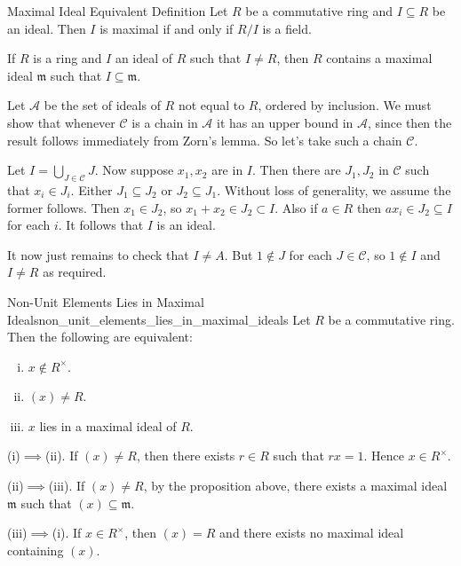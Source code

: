 \begin{proposition}{Maximal Ideal Equivalent Definition}{}
    Let $R$ be a commutative ring and $I\subseteq R$ be an ideal. Then $I$ is maximal if and only if $R/I$ is a field.  
\end{proposition}

\begin{proposition}{}{}
    If $R$ is a ring and $I$ an ideal of $R$ such that $I \neq R$, then $R$ contains a maximal ideal $\mathfrak{m}$ such that $I \subseteq \mathfrak{m}$.
\end{proposition}

\begin{prf}
    Let $\mathcal{A}$ be the set of ideals of $R$ not equal to $R$, ordered by inclusion. We must show that whenever $\mathcal{C}$ is a chain in $\mathcal{A}$ it has an upper bound in $\mathcal{A}$, since then the result follows immediately from Zorn's lemma. So let's take such a chain $\mathcal{C}$.

Let $I=\bigcup_{J \in \mathcal{C}} J$. Now suppose $x_1, x_2$ are in $I$. Then there are $J_1, J_2$ in $\mathcal{C}$ such that $x_i \in J_i$. Either $J_1 \subseteq J_2$ or $J_2 \subseteq J_1$. Without loss of generality, we assume the former follows. Then $x_1 \in J_2$, so $x_1+x_2 \in J_2 \subset I$. Also if $a \in R$ then $a x_i \in J_2 \subseteq I$ for each $i$. It follows that $I$ is an ideal.

It now just remains to check that $I \neq A$. But $1 \notin J$ for each $J \in \mathcal{C}$, so $1 \notin I$ and $I \neq R$ as required.
\end{prf}

\begin{proposition}{Non-Unit Elements Lies in Maximal Ideals}{non_unit_elements_lies_in_maximal_ideals}
    Let $R$ be a commutative ring. Then the following are equivalent:
    \begin{enumerate}[(i)]
        \item $x\notin R^\times$.
        \item $(x)\ne R$.
        \item $x$ lies in a maximal ideal of $R$.
    \end{enumerate}
\end{proposition}

\begin{prf}
    (i)$\implies$(ii). If $(x)\ne R$, then there exists $r\in R$ such that $rx=1$. Hence $x\in R^\times$.
    
    (ii)$\implies$(iii). If $(x)\ne R$, by the proposition above, there exists a maximal ideal $\mathfrak{m}$ such that $(x)\subseteq \mathfrak{m}$.

    (iii)$\implies$(i). If $x\in R^{\times}$, then $(x)=R$ and there exists no maximal ideal containing $(x)$.
\end{prf}

